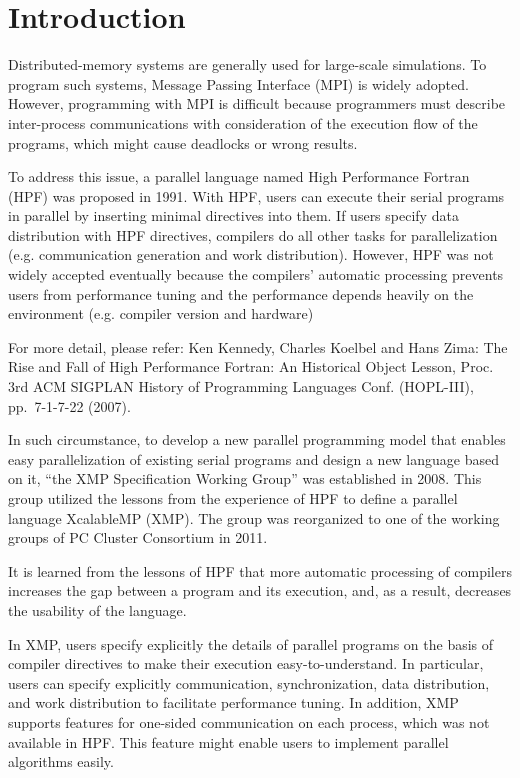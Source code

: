 \section{Introduction}

Distributed-memory systems are generally used for large-scale
simulations. To program such systems, Message Passing Interface (MPI) is
widely adopted. However, programming with MPI is difficult because
programmers must describe inter-process communications with
consideration of the execution flow of the programs, which might cause
deadlocks or wrong results.

To address this issue, a parallel language named High Performance
Fortran (HPF) was proposed in 1991. With HPF, users can execute their
serial programs in parallel by inserting minimal directives into
them. If users specify data distribution with HPF directives, compilers
do all other tasks for parallelization (e.g. communication generation
and work distribution). However, HPF was not widely accepted eventually
because the compilers' automatic processing prevents users from
performance tuning and the performance depends heavily on the
environment (e.g. compiler version and hardware)

\begin{mynote}
For more detail, please refer: Ken Kennedy,
Charles Koelbel and Hans Zima: The Rise and Fall of High Performance
Fortran: An Historical Object Lesson, Proc. 3rd ACM SIGPLAN History of
Programming Languages Conf. (HOPL-III), pp.~7-1-7-22 (2007).
\end{mynote}

In such circumstance, to develop a new parallel programming model that
enables easy parallelization of existing serial programs and design a
new language based on it, ``the XMP Specification Working Group'' was
established in 2008. This group utilized the lessons from the experience
of HPF to define a parallel language XcalableMP (XMP). The group was
reorganized to one of the working groups of PC Cluster Consortium in
2011.

It is learned from the lessons of HPF that more automatic processing of
compilers increases the gap between a program and its execution, and, as
a result, decreases the usability of the language.

In XMP, users specify explicitly the details of parallel programs on the
basis of compiler directives to make their execution
easy-to-understand. In particular, users can specify explicitly
communication, synchronization, data distribution, and work distribution
to facilitate performance tuning. In addition, XMP supports features for
one-sided communication on each process, which was not available in
HPF. This feature might enable users to implement parallel algorithms
easily.


